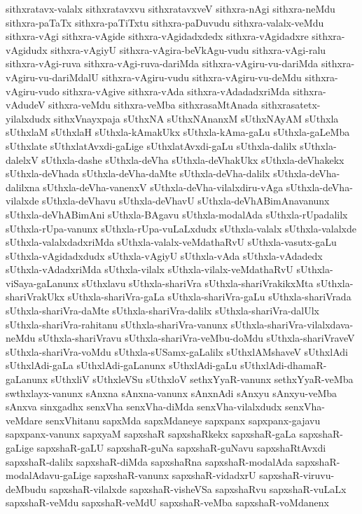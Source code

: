 {sithxratavx-valalx
sithxratavxvu
sithxratavxveV
sithxra-nAgi
sithxra-neMdu
sithxra-paTaTx
sithxra-paTiTxtu
sithxra-paDuvudu
sithxra-valalx-veMdu
sithxra-vAgi
sithxra-vAgide
sithxra-vAgidadxdedx
sithxra-vAgidadxre
sithxra-vAgidudx
sithxra-vAgiyU
sithxra-vAgira-beVkAgu-vudu
sithxra-vAgi-ralu
sithxra-vAgi-ruva
sithxra-vAgi-ruva-dariMda
sithxra-vAgiru-vu-dariMda
sithxra-vAgiru-vu-dariMdalU
sithxra-vAgiru-vudu
sithxra-vAgiru-vu-deMdu
sithxra-vAgiru-vudo
sithxra-vAgive
sithxra-vAda
sithxra-vAdadadxriMda
sithxra-vAdudeV
sithxra-veMdu
sithxra-veMba
sithxrasaMtAnada
sithxrasatetx-yilalxdudx
sithxVnayxpaja
sUthxNA
sUthxNAnanxM
sUthxNAyAM
sUthxla
sUthxlaM
sUthxlaH
sUthxla-kAmakUkx
sUthxla-kAma-gaLu
sUthxla-gaLeMba
sUthxlate
sUthxlatAvxdi-gaLige
sUthxlatAvxdi-gaLu
sUthxla-dalilx
sUthxla-dalelxV
sUthxla-dashe
sUthxla-deVha
sUthxla-deVhakUkx
sUthxla-deVhakekx
sUthxla-deVhada
sUthxla-deVha-daMte
sUthxla-deVha-dalilx
sUthxla-deVha-dalilxna
sUthxla-deVha-vanenxV
sUthxla-deVha-vilalxdiru-vAga
sUthxla-deVha-vilalxde
sUthxla-deVhavu
sUthxla-deVhavU
sUthxla-deVhABimAnavanunx
sUthxla-deVhABimAni
sUthxla-BAgavu
sUthxla-modalAda
sUthxla-rUpadalilx
sUthxla-rUpa-vanunx
sUthxla-rUpa-vuLaLxdudx
sUthxla-valalx
sUthxla-valalxde
sUthxla-valalxdadxriMda
sUthxla-valalx-veMdathaRvU
sUthxla-vasutx-gaLu
sUthxla-vAgidadxdudx
sUthxla-vAgiyU
sUthxla-vAda
sUthxla-vAdadedx
sUthxla-vAdadxriMda
sUthxla-vilalx
sUthxla-vilalx-veMdathaRvU
sUthxla-viSaya-gaLanunx
sUthxlavu
sUthxla-shariVra
sUthxla-shariVrakikxMta
sUthxla-shariVrakUkx
sUthxla-shariVra-gaLa
sUthxla-shariVra-gaLu
sUthxla-shariVrada
sUthxla-shariVra-daMte
sUthxla-shariVra-dalilx
sUthxla-shariVra-dalUlx
sUthxla-shariVra-rahitanu
sUthxla-shariVra-vanunx
sUthxla-shariVra-vilalxdava-neMdu
sUthxla-shariVravu
sUthxla-shariVra-veMbu-doMdu
sUthxla-shariVraveV
sUthxla-shariVra-voMdu
sUthxla-sUSamx-gaLalilx
sUthxlAMshaveV
sUthxlAdi
sUthxlAdi-gaLa
sUthxlAdi-gaLanunx
sUthxlAdi-gaLu
sUthxlAdi-dhamaR-gaLanunx
sUthxliV
sUthxleVSu
sUthxloV
sethxYyaR-vanunx
sethxYyaR-veMba
swthxlayx-vanunx
sAnxna
sAnxna-vanunx
sAnxnAdi
sAnxyu
sAnxyu-veMba
sAnxva
sinxgadhx
senxVha
senxVha-diMda
senxVha-vilalxdudx
senxVha-veMdare
senxVhitanu
sapxMda
sapxMdaneye
sapxpanx
sapxpanx-gajavu
sapxpanx-vanunx
sapxyaM
sapxshaR
sapxshaRkekx
sapxshaR-gaLa
sapxshaR-gaLige
sapxshaR-gaLU
sapxshaR-guNa
sapxshaR-guNavu
sapxshaRtAvxdi
sapxshaR-dalilx
sapxshaR-diMda
sapxshaRna
sapxshaR-modalAda
sapxshaR-modalAdavu-gaLige
sapxshaR-vanunx
sapxshaR-vidadxrU
sapxshaR-viruvu-deMbudu
sapxshaR-vilalxde
sapxshaR-visheVSa
sapxshaRvu
sapxshaR-vuLaLx
sapxshaR-veMdu
sapxshaR-veMdU
sapxshaR-veMba
sapxshaR-voMdanenx
}
